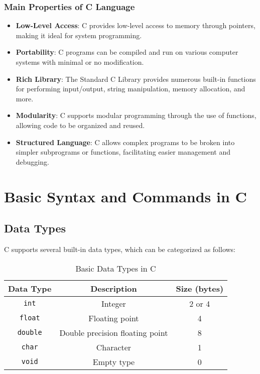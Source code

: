\subsubsection{Main Properties of C Language}
\begin{itemize}
    \item \textbf{Low-Level Access}: C provides low-level access to memory through pointers, making it ideal for system programming.
    \item \textbf{Portability}: C programs can be compiled and run on various computer systems with minimal or no modification.
    \item \textbf{Rich Library}: The Standard C Library provides numerous built-in functions for performing input/output, string manipulation, memory allocation, and more.
    \item \textbf{Modularity}: C supports modular programming through the use of functions, allowing code to be organized and reused.
    \item \textbf{Structured Language}: C allows complex programs to be broken into simpler subprograms or functions, facilitating easier management and debugging.
\end{itemize}

\section{Basic Syntax and Commands in C}
\subsection{Data Types}
C supports several built-in data types, which can be categorized as follows:

\begin{table}[h!]
\centering
\begin{tabular}{|c|c|c|}
\hline
\textbf{Data Type} & \textbf{Description} & \textbf{Size (bytes)} \\
\hline
\texttt{int} & Integer & 2 or 4 \\
\texttt{float} & Floating point & 4 \\
\texttt{double} & Double precision floating point & 8 \\
\texttt{char} & Character & 1 \\
\texttt{void} & Empty type & 0 \\
\hline
\end{tabular}
\caption{Basic Data Types in C}
\label{table:data_types}
\end{table}

